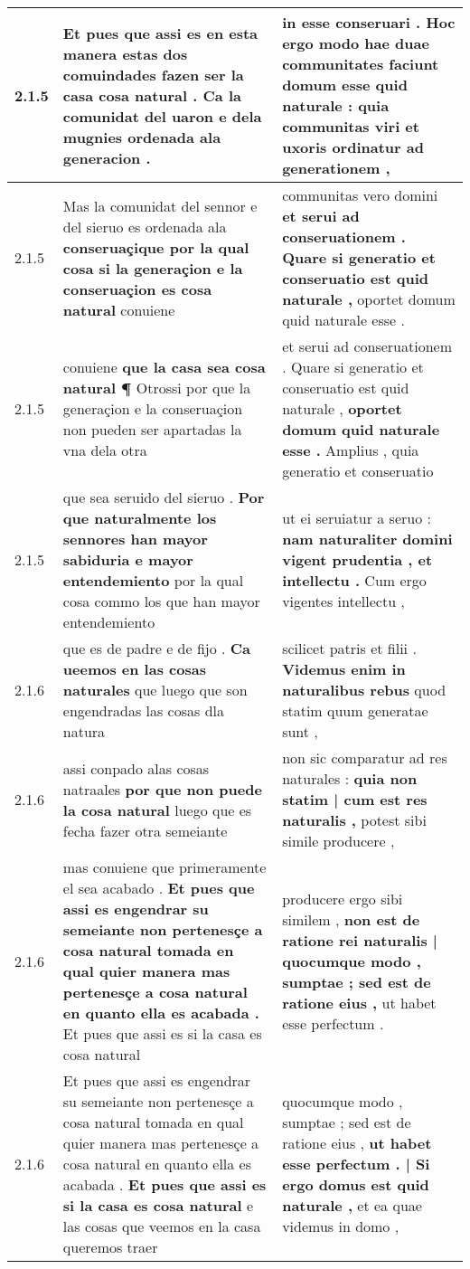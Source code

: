 \begin{tabular}{|p{1cm}|p{6.5cm}|p{6.5cm}|}
2.1.5 & Et pues que assi es en esta manera estas dos comuindades \textbf{ fazen ser la casa cosa natural . } Ca la comunidat del uaron e dela mugnies ordenada ala generacion . & in esse conseruari . \textbf{ Hoc ergo modo hae duae communitates faciunt domum esse quid naturale : } quia communitas viri et uxoris ordinatur ad generationem , \\\hline
2.1.5 & Mas la comunidat del sennor e del sieruo es ordenada ala \textbf{ conseruaçique por la qual cosa si la generaçion e la conseruaçion es cosa natural } conuiene & communitas vero domini \textbf{ et serui ad conseruationem . Quare si generatio et conseruatio est quid naturale , } oportet domum quid naturale esse . \\\hline
2.1.5 & conuiene \textbf{ que la casa sea cosa natural ¶ } Otrossi por que la generaçion e la conseruaçion non pueden ser apartadas la vna dela otra & et serui ad conseruationem . Quare si generatio et conseruatio est quid naturale , \textbf{ oportet domum quid naturale esse . } Amplius , quia generatio et conseruatio \\\hline
2.1.5 & que sea seruido del sieruo . \textbf{ Por que naturalmente los sennores han mayor sabiduria e mayor entendemiento } por la qual cosa commo los que han mayor entendemiento & ut ei seruiatur a seruo : \textbf{ nam naturaliter domini vigent prudentia , et intellectu . } Cum ergo vigentes intellectu , \\\hline
2.1.6 & que es de padre e de fijo . \textbf{ Ca ueemos en las cosas naturales } que luego que son engendradas las cosas dla natura & scilicet patris et filii . \textbf{ Videmus enim in naturalibus rebus } quod statim quum generatae sunt , \\\hline
2.1.6 & assi conpado alas cosas natraales \textbf{ por que non puede la cosa natural } luego que es fecha fazer otra semeiante & non sic comparatur ad res naturales : \textbf{ quia non statim | cum est res naturalis , } potest sibi simile producere , \\\hline
2.1.6 & mas conuiene que primeramente el sea acabado . \textbf{ Et pues que assi es engendrar su semeiante non pertenesçe a cosa natural tomada en qual quier manera mas pertenesçe a cosa natural en quanto ella es acabada . } Et pues que assi es si la casa es cosa natural & producere ergo sibi similem , \textbf{ non est de ratione rei naturalis | quocumque modo , sumptae ; sed est de ratione eius , } ut habet esse perfectum . \\\hline
2.1.6 & Et pues que assi es engendrar su semeiante non pertenesçe a cosa natural tomada en qual quier manera mas pertenesçe a cosa natural en quanto ella es acabada . \textbf{ Et pues que assi es si la casa es cosa natural } e las cosas que veemos en la casa queremos traer & quocumque modo , sumptae ; sed est de ratione eius , \textbf{ ut habet esse perfectum . | Si ergo domus est quid naturale , } et ea quae videmus in domo , \\\hline

\end{tabular}

